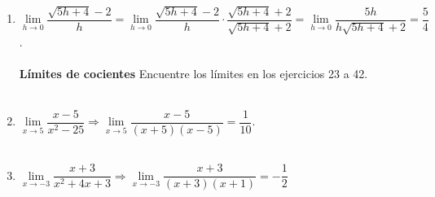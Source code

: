 \begin{enumerate}

\item $\lim\limits_{h\to 0} \dfrac{\sqrt{5h+4}-2}{h} = \lim\limits_{h\to 0} \dfrac{\sqrt{5h+4}-2}{h} \cdot \dfrac{\sqrt{5h+4}+2}{\sqrt{5h+4}+2} = \lim\limits_{h\to 0}  \dfrac{5h}{h\sqrt{5h+4}+2} = \dfrac{5}{4}$.\\\\

\textbf{Límites de cocientes} Encuentre los límites en los ejercicios 23 a 42.\\\\

\item $\lim\limits_{x\to 5} \dfrac{x-5}{x^2 - 25} \Longrightarrow \lim\limits_{x\to 5}\dfrac{x-5}{(x+5)(x-5)} = \dfrac{1}{10}$.\\\\

\item $\lim\limits_{x\to -3} \dfrac{x+3}{x^2 + 4x + 3} \Longrightarrow \lim\limits_{x\to -3} \dfrac{x+3}{(x+3)(x+1)} = -\dfrac{1}{2}$\\\\


\end{enumerate}
